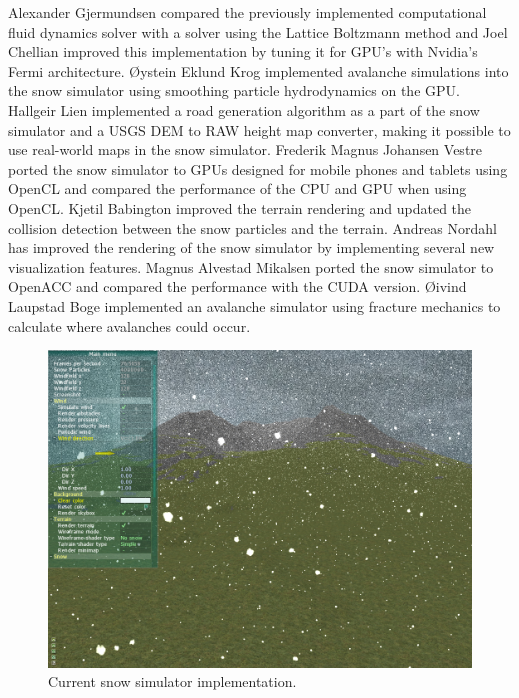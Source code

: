 Alexander Gjermundsen\cite{lbmWind} compared the previously implemented computational fluid 
dynamics solver with a solver using the Lattice Boltzmann method and Joel Chellian\cite{fermi} 
improved this implementation by tuning it for GPU's with Nvidia's Fermi architecture. 
Øystein Eklund Krog\cite{avalanche1} implemented avalanche simulations into the snow simulator 
using smoothing particle hydrodynamics on the GPU. 
Hallgeir Lien\cite{road} implemented a road generation algorithm as a part of the snow 
simulator and a USGS DEM to RAW height map converter, making it possible to use 
real-world maps in the snow simulator. 
Frederik Magnus Johansen Vestre\cite{openclSnowThesis} ported the snow simulator to GPUs designed for 
mobile phones and tablets using OpenCL and compared the performance of the CPU and 
GPU when using OpenCL.
Kjetil Babington\cite{snowTerrainThesis} improved the terrain rendering and updated the collision detection 
between the snow particles and the terrain. 
Andreas Nordahl\cite{realisticSnowTerrainThesis} has improved the rendering of the snow simulator by implementing 
several new visualization features.
Magnus Alvestad Mikalsen\cite{openAccThesis} ported the snow simulator to OpenACC and compared the 
performance with the CUDA version. 
Øivind Laupstad Boge\cite{avalanche2} implemented an avalanche simulator using fracture mechanics 
to calculate where avalanches could occur. 

\begin{figure}[ht]
	\center
	\includegraphics[width=1.0\textwidth]{images/snow/gpu/snow7}
	\caption{Current snow simulator implementation.}
	\label{fig:gpuSnow}
\end{figure}

